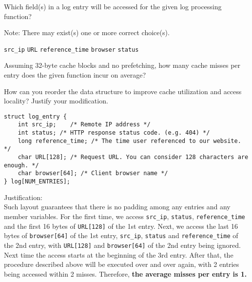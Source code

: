 \begin{questions}

\question[2] Which field(s) in a log entry will be accessed for the
given log processing function?

{
    \begin{solution}
        Note: There may exist(s) one or more correct choice(s).\\
        \begin{oneparcheckboxes}
            \CorrectChoice \texttt{src\_ip}
            \choice \texttt{URL}
            \CorrectChoice \texttt{reference\_time}
            \choice \texttt{browser}
            \CorrectChoice \texttt{status}
        \end{oneparcheckboxes}
    \end{solution}
}

\question[1] Assuming 32-byte cache blocks and no prefetching, how
many cache misses per entry does the given function incur on average? \label{q:miss}

{
    \begin{solution}
    \end{solution}
}

\question[3] How can you reorder the data structure to improve
cache utilization and access locality? Justify your modification.

{
    \begin{solution}
        \begin{verbatim}
struct log_entry {
    int src_ip;    /* Remote IP address */
    int status; /* HTTP response status code. (e.g. 404) */
    long reference_time; /* The time user referenced to our website. */
    char URL[128]; /* Request URL. You can consider 128 characters are enough. */
    char browser[64]; /* Client browser name */
} log[NUM_ENTRIES];
        \end{verbatim}
        Justification:\\
        Such layout guarantees that there is no padding among any entries and any member variables. For the first time, we access \texttt{src\_ip}, \texttt{status}, \texttt{reference\_time} and the first 16 bytes of \texttt{URL[128]} of the 1st entry. Next, we access the last 16 bytes of \texttt{browser[64]} of the 1st entry, \texttt{src\_ip}, \texttt{status} and \texttt{reference\_time} of the 2nd entry, with \texttt{URL[128]} and \texttt{browser[64]} of the 2nd entry being ignored. Next time the access starts at the beginning of the 3rd entry. After that, the procedure described above will be executed over and over again, with 2 entries being accessed within 2 misses. Therefore, \textbf{the average misses per entry is 1.}
    \end{solution}
}



\end{questions}
